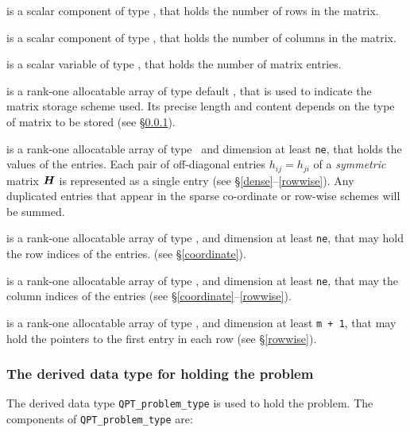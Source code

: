 \documentclass{galahad}
\begin{document}
\begin{description}

 is a scalar component of type \integer,
that holds the number of rows in the matrix.

 is a scalar component of type \integer,
that holds the number of columns in the matrix.

 is a scalar variable of type \integer, that
holds the number of matrix entries.

 is a rank-one allocatable array of type default \character, that
is used to indicate the matrix storage scheme used. Its precise length and
content depends on the type of matrix to be stored (see \S\ref{typeprob}).

 is a rank-one allocatable array of type \realdp\,
and dimension at least {\tt ne}, that holds the values of the entries.
Each pair of off-diagonal entries $h_{ij} = h_{ji}$ of a {\em symmetric}
matrix ${\bm{H}}$ is represented as a single entry
(see \S\ref{dense}--\ref{rowwise}).
Any duplicated entries that appear in the sparse
co-ordinate or row-wise schemes will be summed.

 is a rank-one allocatable array of type \integer,
and dimension at least {\tt ne}, that may hold the row indices of the entries.
(see \S\ref{coordinate}).

 is a rank-one allocatable array of type \integer,
and dimension at least {\tt ne}, that may the column indices of the entries
(see \S\ref{coordinate}--\ref{rowwise}).

 is a rank-one allocatable array of type \integer,
and dimension at least {\tt m + 1}, that may hold the pointers to
the first entry in each row (see \S\ref{rowwise}).

\end{description}


\subsubsection{The derived data type for holding the problem}\label{typeprob}
The derived data type {\tt QPT\_problem\_type} is used to hold
the problem. The components of
{\tt QPT\_problem\_type}
are:
\end{document}
